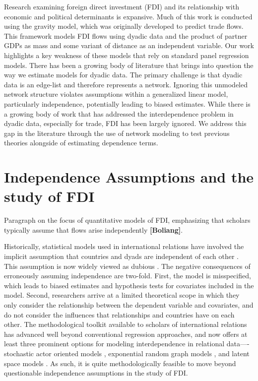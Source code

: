 \documentclass{article}
\begin{document}
Research examining foreign direct investment (FDI) and its relationship with economic and political determinants is expansive. Much of this work is conducted using the gravity model, which was originally developed to predict trade flows. This framework models FDI flows using dyadic data and the product of partner GDPs as mass and some variant of distance as an independent variable. Our work highlights a key weakness of these models that rely on standard panel regression models. There has been a growing body of literature that brings into question the way we estimate models for dyadic data. The primary challenge is that dyadic data is an edge-list and therefore represents a network. Ignoring this unmodeled network structure violates assumptions within a generalized linear model, particularly independence, potentially leading to biased estimates. While there is a growing body of work that has addressed the interdependence problem in dyadic data, especially for trade, FDI has been largely ignored. We address this gap in the literature through the use of network modeling to test previous theories alongside of estimating dependence terms.

\section{Independence Assumptions and the study of FDI}

Paragraph on the focus of quantitative models of FDI, emphasizing that scholars typically assume that flows arise independently {\bf [Boliang]}.

Historically, statistical models used in international relations have involved the implicit assumption that countries and dyads are independent of each other \citep{diehl2016conditional,ward2007persistent}. This assumption is now widely viewed as dubious \citep[see, e.g., ][]{ward2007persistent, chu2010homogenization,cranmer2016critique,dorff2013networks,lee2013network,howell2013geography,kinne2016agreeing}. The negative consequences of erroneously assuming independence are two-fold. First, the model is misspecified, which leads to biased estimates and hypothesis tests for covariates included in the model. Second, researchers arrive at a limited theoretical scope in which they only consider the relationship between the dependent variable and covariates, and do not consider the influences that relationships and countries have on each other. The methodological toolkit available to scholars of international relations has advanced well beyond conventional regression approaches, and now offers at least three prominent options for modeling interdependence in relational data----stochastic actor oriented models \citep[e.g., ][]{camber2010geometry,kinne2016agreeing,kinne2013network,kinne2014dependent,warren2016modeling}, exponential random graph models \citep[e.g.,][]{cranmer2012complex,cranmer2012toward,raeymaeckers2016influence}, and latent space models \citep[e.g., ][]{ward2007disputes,ward2013gravity,metternich2013antigovernment}. As such, it is quite methodologically feasible to move beyond questionable independence assumptions in the study of FDI.
\end{document}
